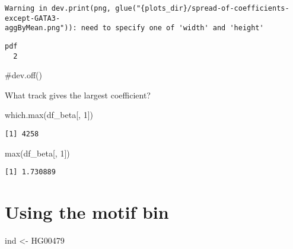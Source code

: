 \documentclass[
  letterpaper,
  DIV=11,
  numbers=noendperiod]{scrartcl}
\newenvironment{Shaded}{\begin{snugshade}}{\end{snugshade}}
\newcommand{\CommentTok}[1]{\textcolor[rgb]{0.37,0.37,0.37}{#1}}
\newcommand{\DecValTok}[1]{\textcolor[rgb]{0.68,0.00,0.00}{#1}}
\newcommand{\FunctionTok}[1]{\textcolor[rgb]{0.28,0.35,0.67}{#1}}
\newcommand{\NormalTok}[1]{\textcolor[rgb]{0.00,0.23,0.31}{#1}}
\newcommand{\OtherTok}[1]{\textcolor[rgb]{0.00,0.23,0.31}{#1}}
\newcommand{\StringTok}[1]{\textcolor[rgb]{0.13,0.47,0.30}{#1}}
\begin{document}
\begin{verbatim}
Warning in dev.print(png, glue("{plots_dir}/spread-of-coefficients-except-GATA3-
aggByMean.png")): need to specify one of 'width' and 'height'
\end{verbatim}

\begin{verbatim}
pdf 
  2 
\end{verbatim}

\begin{Shaded}
\begin{Highlighting}[]
\CommentTok{\#dev.off()}
\end{Highlighting}
\end{Shaded}

What track gives the largest coefficient?

\begin{Shaded}
\begin{Highlighting}[]
\FunctionTok{which.max}\NormalTok{(df\_beta[, }\DecValTok{1}\NormalTok{])}
\end{Highlighting}
\end{Shaded}

\begin{verbatim}
[1] 4258
\end{verbatim}

\begin{Shaded}
\begin{Highlighting}[]
\FunctionTok{max}\NormalTok{(df\_beta[, }\DecValTok{1}\NormalTok{])}
\end{Highlighting}
\end{Shaded}

\begin{verbatim}
[1] 1.730889
\end{verbatim}

\newpage

\hypertarget{using-the-motif-bin}{%
\section{Using the motif bin}\label{using-the-motif-bin}}

\begin{Shaded}
\begin{Highlighting}[]
\NormalTok{ind }\OtherTok{\textless{}{-}} \StringTok{\textquotesingle{}HG00479\textquotesingle{}}
\end{Highlighting}
\end{Shaded}
\end{document}
